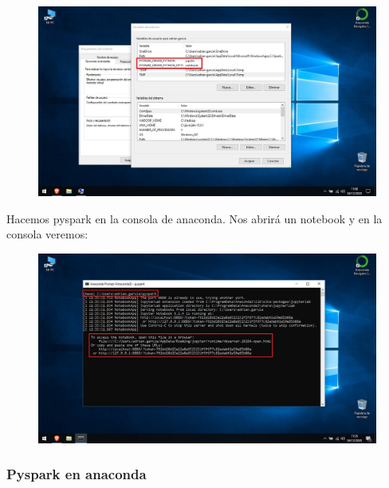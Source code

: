 \documentclass[a4paper,10pt]{article}
\begin{document}
\begin{figure}[H]
\begin{center}
\includegraphics[width=500pt]{./fotos/introduccion/19 - notebook desde comandos (V).jpg}
\end{center}
\end{figure}

Hacemos pyspark en la consola de anaconda. Nos abrirá un notebook y en la consola veremos:

\begin{figure}[H]
\begin{center}
\includegraphics[width=500pt]{./fotos/introduccion/21 - Abriendo notebook al ejecutar pyspark (V).jpg}
\end{center}
\end{figure}

\subsubsection{Pyspark en anaconda}
\end{document}
